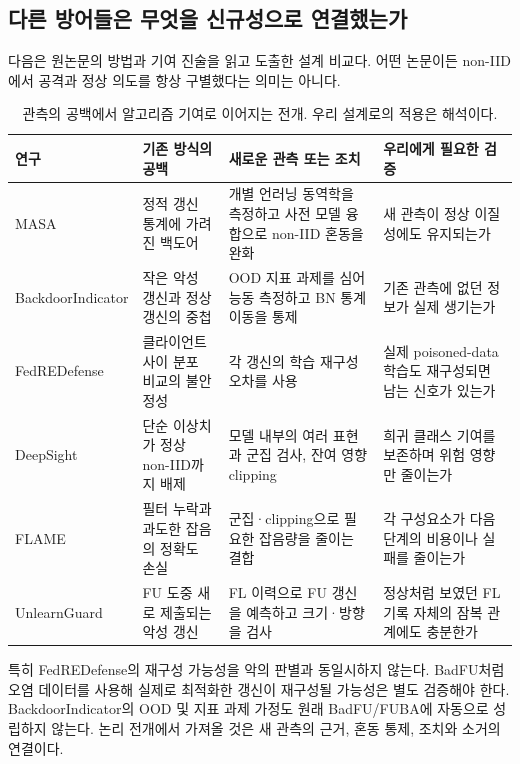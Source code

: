 \documentclass[10pt,a4paper]{article}
\begin{document}
\subsection{다른 방어들은 무엇을 신규성으로 연결했는가}
다음은 원논문의 방법과 기여 진술을 읽고 도출한 설계 비교다.
어떤 논문이든 non-IID에서 공격과 정상 의도를 항상 구별했다는 의미는 아니다.
\begin{table}[ht]\centering\small
\caption{관측의 공백에서 알고리즘 기여로 이어지는 전개. 우리 설계로의 적용은 해석이다.}
\begin{tabularx}{\linewidth}{lXXX}\toprule
연구 & 기존 방식의 공백 & 새로운 관측 또는 조치 & 우리에게 필요한 검증\\\midrule
MASA\cite{masa} & 정적 갱신 통계에 가려진 백도어 & 개별 언러닝 동역학을 측정하고 사전 모델 융합으로 non-IID 혼동을 완화 & 새 관측이 정상 이질성에도 유지되는가\\
BackdoorIndicator\cite{indicator} & 작은 악성 갱신과 정상 갱신의 중첩 & OOD 지표 과제를 심어 능동 측정하고 BN 통계 이동을 통제 & 기존 관측에 없던 정보가 실제 생기는가\\
FedREDefense\cite{fedredefense} & 클라이언트 사이 분포 비교의 불안정성 & 각 갱신의 학습 재구성 오차를 사용 & 실제 poisoned-data 학습도 재구성되면 남는 신호가 있는가\\
DeepSight\cite{deepsight} & 단순 이상치가 정상 non-IID까지 배제 & 모델 내부의 여러 표현과 군집 검사, 잔여 영향 clipping & 희귀 클래스 기여를 보존하며 위험 영향만 줄이는가\\
FLAME\cite{flame} & 필터 누락과 과도한 잡음의 정확도 손실 & 군집·clipping으로 필요한 잡음량을 줄이는 결합 & 각 구성요소가 다음 단계의 비용이나 실패를 줄이는가\\
UnlearnGuard\cite{unlearnguard} & FU 도중 새로 제출되는 악성 갱신 & FL 이력으로 FU 갱신을 예측하고 크기·방향을 검사 & 정상처럼 보였던 FL 기록 자체의 잠복 관계에도 충분한가\\\bottomrule
\end{tabularx}
\end{table}
특히 FedREDefense의 재구성 가능성을 악의 판별과 동일시하지 않는다.
BadFU처럼 오염 데이터를 사용해 실제로 최적화한 갱신이 재구성될 가능성은 별도 검증해야 한다.
BackdoorIndicator의 OOD 및 지표 과제 가정도 원래 BadFU/FUBA에 자동으로 성립하지 않는다.
논리 전개에서 가져올 것은 새 관측의 근거, 혼동 통제, 조치와 소거의 연결이다.
\end{document}
